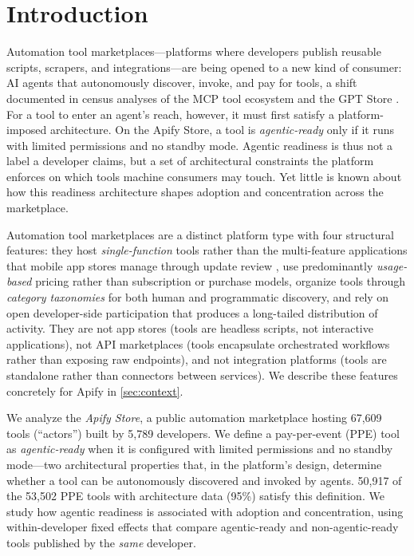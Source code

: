 \section{Introduction}
\label{sec:introduction}

Automation tool marketplaces---platforms where developers publish reusable
scripts, scrapers, and integrations---are being opened to a new kind of
consumer: AI agents that autonomously discover, invoke, and pay for tools, a
shift documented in census analyses of the MCP tool ecosystem
\cite{stein2026mcpecosystem} and the GPT Store \cite{su2024gptstore}. For a tool
to enter an agent's
reach, however, it must first satisfy a platform-imposed architecture. On the
Apify Store, a tool is \emph{agentic-ready} only if it runs with limited
permissions and no standby mode. Agentic readiness is thus not a label a
developer claims, but a set of architectural constraints the platform enforces
on which tools machine consumers may touch. Yet little is known about how this
readiness architecture shapes adoption and concentration across the
marketplace.

Automation tool marketplaces are a distinct platform
type with four structural features: they host \emph{single-function} tools
rather than the multi-feature applications that mobile app stores manage
through update review \cite{comino2019appstore}, use
predominantly \emph{usage-based}
pricing rather than subscription or purchase models, organize tools through
\emph{category taxonomies} for both human and programmatic discovery, and rely
on open developer-side participation that produces a long-tailed distribution
of activity. They are not app stores (tools are headless scripts, not
interactive applications), not API marketplaces (tools encapsulate orchestrated
workflows rather than exposing raw endpoints), and not integration platforms
(tools are standalone rather than connectors between services). We describe
these features concretely for Apify in \autoref{sec:context}.\label{sec:bg:automation}

We analyze the \emph{Apify Store}, a public automation marketplace hosting
67,609 tools (``actors'') built by 5,789 developers. We define a pay-per-event
(PPE) tool as \emph{agentic-ready} when it is configured with limited
permissions and no standby mode---two architectural properties that, in the
platform's design, determine whether a tool can be autonomously discovered and
invoked by agents. 50{,}917 of the 53{,}502 PPE tools with architecture data
(95\%) satisfy this definition. We study how agentic readiness is associated
with adoption and concentration, using within-developer fixed effects that
compare agentic-ready and non-agentic-ready tools published by the \emph{same}
developer.

